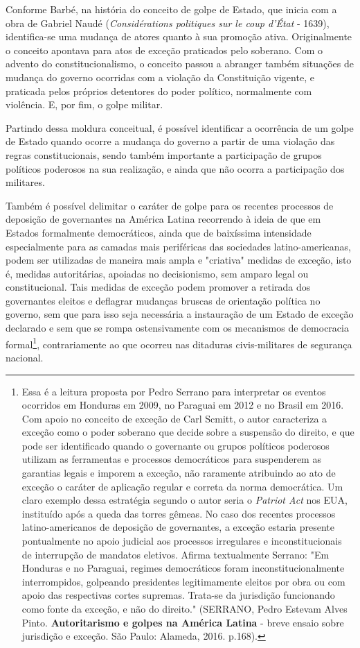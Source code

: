 Conforme Barbé, na história do conceito de golpe de Estado, que inicia
com a obra de Gabriel Naudé (\emph{Considérations politiques sur le coup
d'État} - 1639), identifica-se uma mudança de atores quanto à sua
promoção ativa. Originalmente o conceito apontava para atos de exceção
praticados pelo soberano. Com o advento do constitucionalismo, o
conceito passou a abranger também situações de mudança do governo
ocorridas com a violação da Constituição vigente, e praticada pelos
próprios detentores do poder político, normalmente com violência. E, por
fim, o golpe militar.

Partindo dessa moldura conceitual, é possível identificar a ocorrência
de um golpe de Estado quando ocorre a mudança do governo a partir de uma
violação das regras constitucionais, sendo também importante a
participação de grupos políticos poderosos na sua realização, e ainda
que não ocorra a participação dos militares.

Também é possível delimitar o caráter de golpe para os recentes
processos de deposição de governantes na América Latina recorrendo à
ideia de que em Estados formalmente democráticos, ainda que de
baixíssima intensidade especialmente para as camadas mais periféricas
das sociedades latino-americanas, podem ser utilizadas de maneira mais
ampla e "criativa" medidas de exceção, isto é, medidas autoritárias,
apoiadas no decisionismo, sem amparo legal ou constitucional. Tais
medidas de exceção podem promover a retirada dos governantes eleitos e
deflagrar mudanças bruscas de orientação política no governo, sem que
para isso seja necessária a instauração de um Estado de exceção
declarado e sem que se rompa ostensivamente com os mecanismos de
democracia formal\footnote{Essa é a leitura proposta por Pedro Serrano
  para interpretar os eventos ocorridos em Honduras em 2009, no Paraguai
  em 2012 e no Brasil em 2016. Com apoio no conceito de exceção de Carl
  Scmitt, o autor caracteriza a exceção como o poder soberano que decide
  sobre a suspensão do direito, e que pode ser identificado quando o
  governante ou grupos políticos poderosos utilizam as ferramentas e
  processos democráticos para suspenderem as garantias legais e imporem
  a exceção, não raramente atribuindo ao ato de exceção o caráter de
  aplicação regular e correta da norma democrática. Um claro exemplo
  dessa estratégia segundo o autor seria o \emph{Patriot Act} nos EUA,
  instituído após a queda das torres gêmeas. No caso dos recentes
  processos latino-americanos de deposição de governantes, a exceção
  estaria presente pontualmente no apoio judicial aos processos
  irregulares e inconstitucionais de interrupção de mandatos eletivos.
  Afirma textualmente Serrano: "Em Honduras e no Paraguai, regimes
  democráticos foram inconstitucionalmente interrompidos, golpeando
  presidentes legitimamente eleitos por obra ou com apoio das
  respectivas cortes supremas. Trata-se da jurisdição funcionando como
  fonte da exceção, e não do direito." (SERRANO, Pedro Estevam Alves
  Pinto. \textbf{Autoritarismo e golpes na América Latina} - breve
  ensaio sobre jurisdição e exceção. São Paulo: Alameda, 2016. p.168).},
contrariamente ao que ocorreu nas ditaduras civis-militares de segurança
nacional.

